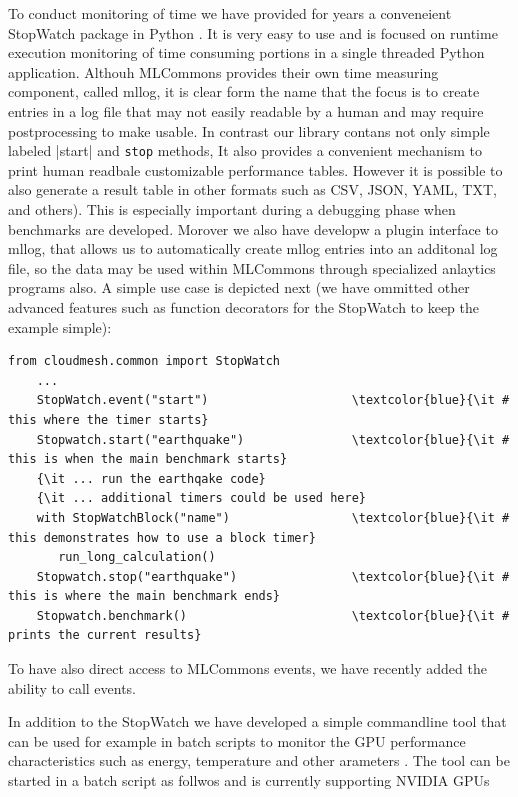 \documentclass[utf8]{FrontiersinVancouver} %
\begin{document}
To conduct monitoring of time we have provided for years a conveneient
StopWatch package in Python \cite{cloudmesh-stopwatch}.  It is very
easy to use and is focused on runtime execution monitoring of time
consuming portions in a single threaded Python application. Althouh
MLCommons provides their own time measuring component, called mllog,
it is clear form the name that the focus is to create entries in a log
file that may not easily readable by a human and may require
postprocessing to make usable. In contrast our library contans not
only simple labeled \vreb|start| and \verb|stop| methods, It also
provides a convenient mechanism to print human readbale customizable
performance tables. However it is possible to also generate a result
table in other formats such as CSV, JSON, YAML, TXT, and others).
This is especially important during a debugging phase when benchmarks
are developed. Morover we also have developw a plugin interface to
mllog, that allows us to automatically create mllog entries into an
additonal log file, so the data may be used within MLCommons through
specialized anlaytics programs also. A simple use case is depicted
next (we have ommitted other advanced features such as function
decorators for the StopWatch to keep the example simple):

{\footnotesize
\begin{Verbatim}[commandchars=\\\{\}]
    from cloudmesh.common import StopWatch 
    ...
    StopWatch.event("start")                    \textcolor{blue}{\it # this where the timer starts}
    Stopwatch.start("earthquake")               \textcolor{blue}{\it # this is when the main benchmark starts}
    {\it ... run the earthqake code}
    {\it ... additional timers could be used here}
    with StopWatchBlock("name")                 \textcolor{blue}{\it # this demonstrates how to use a block timer}
       run_long_calculation()
    Stopwatch.stop("earthquake")                \textcolor{blue}{\it # this is where the main benchmark ends}
    Stopwatch.benchmark()                       \textcolor{blue}{\it # prints the current results}
\end{Verbatim}
}

To have also direct access to MLCommons events, we have recently added
the ability to call events.


In addition to the StopWatch we have developed a simple commandline
tool that can be used for example in batch scripts to monitor the GPU
performance characteristics such as energy, temperature and other
arameters \cite{cloudmesh-gpu}. The tool can be started in a batch
script as follwos and is currently supporting NVIDIA GPUs
\end{document}
